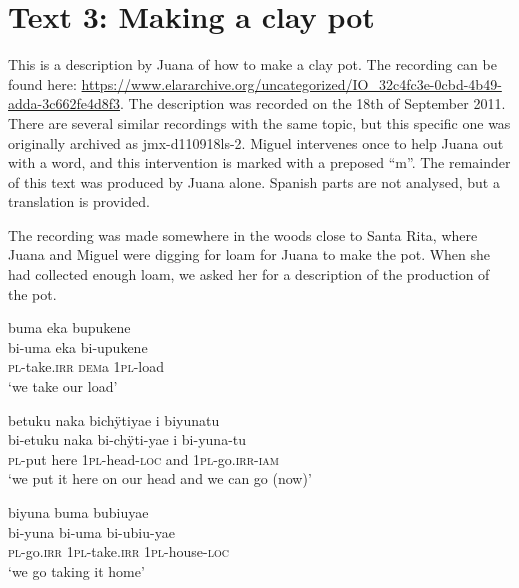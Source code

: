 
\section{Text 3: Making a clay pot}\label{text:ClayPot}

This is a description by Juana of how to make a clay pot. The recording can be found here:
\url{https://www.elararchive.org/uncategorized/IO_32c4fc3e-0cbd-4b49-adda-3c662fe4d8f3}.
The description was recorded on the 18th of September 2011. There are several similar recordings with the same topic, but this specific one was originally archived as jmx-d110918ls-2. Miguel intervenes once to help Juana out with a word, and this intervention is marked with a preposed “m”. The remainder of this text was produced by Juana alone. Spanish parts are not analysed, but a translation is provided.

The recording was made somewhere in the woods close to Santa Rita, where Juana and Miguel were digging for loam for Juana to make the pot. When she had collected enough loam, we asked her for a description of the production of the pot. 



\ea%
\begingl
\glpreamble buma eka bupukene\\
\gla bi-uma eka bi-upukene\\
\textsc{pl}-take.\textsc{irr} \textsc{dem}a 1\textsc{pl}-load\\
\glft ‘we take our load’
\endgl
\xe

\ea%
\begingl 
\glpreamble betuku naka bichÿtiyae i biyunatu\\
\gla bi-etuku naka bi-chÿti-yae i bi-yuna-tu\\ 
\textsc{pl}-put here 1\textsc{pl}-head-\textsc{loc} and 1\textsc{pl}-go.\textsc{irr}-\textsc{iam}\\ 
\glft ‘we put it here on our head and we can go (now)’\\ 
\endgl
\xe


\ea%
\begingl
\glpreamble biyuna buma bubiuyae\\
\gla bi-yuna bi-uma bi-ubiu-yae\\
\textsc{pl}-go.\textsc{irr} 1\textsc{pl}-take.\textsc{irr} 1\textsc{pl}-house-\textsc{loc}\\
\glft ‘we go taking it home’
\endgl
\xe

